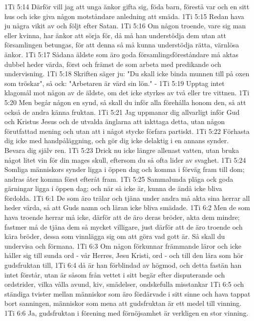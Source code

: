 1Ti 5:14  Därför vill jag att unga änkor gifta sig, föda barn, förestå var och en sitt hus och icke giva någon motståndare anledning att smäda.
1Ti 5:15  Redan hava ju några vikit av och följt efter Satan.
1Ti 5:16  Om någon troende, vare sig man eller kvinna, har änkor att sörja för, då må han understödja dem utan att församlingen betungas, för att denna så må kunna understödja rätta, värnlösa änkor.
1Ti 5:17  Sådana äldste som äro goda församlingsföreståndare må aktas dubbel heder värda, först och främst de som arbeta med predikande och undervisning.
1Ti 5:18  Skriften säger ju: "Du skall icke binda munnen till på oxen som tröskar", så ock: "Arbetaren är värd sin lön." -
1Ti 5:19  Upptag intet klagomål mot någon av de äldste, om det icke styrkes av två eller tre vittnen.
1Ti 5:20  Men begår någon en synd, så skall du inför alla förehålla honom den, så att också de andra känna fruktan.
1Ti 5:21  Jag uppmanar dig allvarligt inför Gud och Kristus Jesus och de utvalda änglarna att iakttaga detta, utan någon förutfattad mening och utan att i något stycke förfara partiskt.
1Ti 5:22  Förhasta dig icke med handpåläggning, och gör dig icke delaktig i en annans synder. Bevara dig själv ren.
1Ti 5:23  Drick nu icke längre allenast vatten, utan bruka något litet vin för din mages skull, eftersom du så ofta lider av svaghet.
1Ti 5:24  Somliga människors synder ligga i öppen dag och komma i förväg fram till dom; andras åter komma först efteråt fram.
1Ti 5:25  Sammalunda pläga ock goda gärningar ligga i öppen dag; och när så icke är, kunna de ändå icke bliva fördolda.
1Ti 6:1  De som äro trälar och tjäna under andra må akta sina herrar all heder värda, så att Guds namn och läran icke bliva smädade.
1Ti 6:2  Men de som hava troende herrar må icke, därför att de äro deras bröder, akta dem mindre; fastmer må de tjäna dem så mycket villigare, just därför att de äro troende och kära bröder, dessa som vinnlägga sig om att göra vad gott är. Så skall du undervisa och förmana.
1Ti 6:3  Om någon förkunnar främmande läror och icke håller sig till sunda ord - vår Herres, Jesu Kristi, ord - och till den lära som hör gudsfruktan till,
1Ti 6:4  då är han förblindad av högmod, och detta fastän han intet förstår, utan är såsom från vettet i sitt begär efter disputerande och ordstrider, vilka vålla avund, kiv, smädelser, ondskefulla misstankar
1Ti 6:5  och ständiga tvister mellan människor som äro fördärvade i sitt sinne och hava tappat bort sanningen, människor som mena att gudsfruktan är ett medel till vinning.
1Ti 6:6  Ja, gudsfruktan i förening med förnöjsamhet är verkligen en stor vinning.
